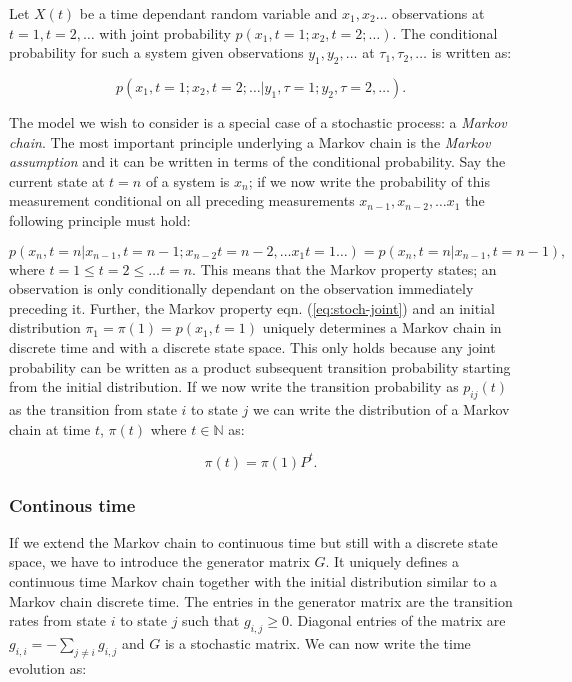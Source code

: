 Let $X(t)$ be a time dependant random variable and $x_1, x_2 \ldots $ observations at $t=1, t =2, \ldots$ with joint probability $p(x_1, t=1; x_2, t=2; \ldots)$. The conditional probability for such a system given observations $y_1, y_2, \ldots$ at $\tau_1, \tau_2, \ldots $ is written as:

\begin{equation}
  \label{eq:stoch-joint-init}
  p(x_1, t=1; x_2, t=2; \ldots | y_1, \tau=1; y_2,\tau=2, \ldots).
\end{equation}

The model we wish to consider is a special case of a stochastic process: a \emph{Markov chain}. The most important principle underlying a Markov chain is the \emph{Markov assumption} and it can be written in terms of the conditional probability. Say the current state at $t=n$ of a system is $x_n$; if we now write the probability of this measurement conditional on all preceding measurements $x_{n-1}, x_{n-2}, \ldots x_1$ the following principle must hold:

\begin{equation}
  \label{eq:stoch-joint}
  p(x_n, t=n | x_{n-1}, t={n-1}; x_{n-2} t={n-2}, \ldots x_1 t=1 \ldots) = p(x_{n},t={n}| x_{n-1},t={n-1}),
\end{equation}
where $t=1 \le t=2 \le \ldots t=n$. This means that the Markov property states; an observation is only conditionally dependant on the observation immediately preceding it. Further, the Markov property eqn. (\ref{eq:stoch-joint}) and an initial distribution $\pi_1 = \pi(1) = p(x_1,t=1)$ uniquely determines a Markov chain in discrete time and with a discrete state space. This only holds because any joint probability can be written as a product subsequent transition probability starting from the initial distribution. If we now write the transition probability as $p_{ij}(t)$ as the transition from state $i$ to state $j$ we can write the distribution of a Markov chain at time $t$, $\pi(t)$ where $t \in \mathbb{N}$ as:

\begin{equation}
  \label{eq:markov-chain}
  \pi(t) = \pi(1)P^t.
\end{equation}

\subsubsection{Continous time}
\label{sec:continous-time}

If we extend the Markov chain to continuous time but still with a discrete state space, we have to introduce the generator matrix $G$. It uniquely defines a continuous time Markov chain together with the initial distribution similar to a Markov chain discrete time. The entries in the generator matrix are the transition rates from state $i$ to state $j$ such that $g_{i,j} \geq 0$. Diagonal entries of the matrix are $g_{i,i} = - \sum_{j \neq i} g_{i,j}$ and $G$ is a stochastic matrix. We can now write the time evolution as:

